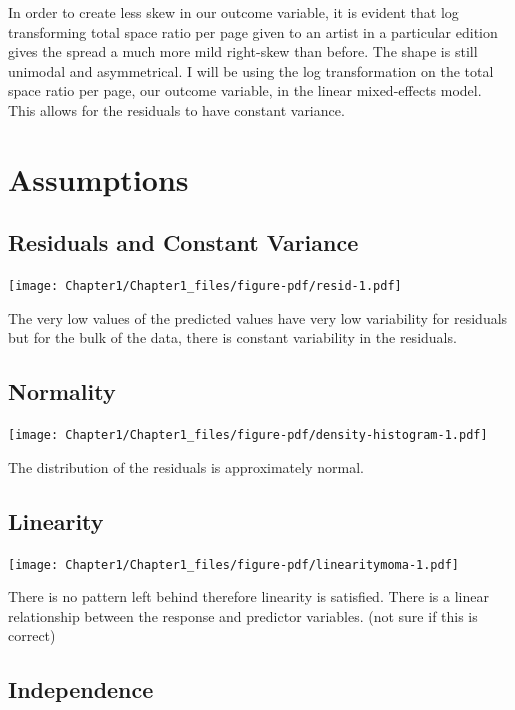\documentclass[
  letterpaper,
  DIV=11,
  numbers=noendperiod]{scrreprt}
\begin{document}
In order to create less skew in our outcome variable, it is evident that
log transforming total space ratio per page given to an artist in a
particular edition gives the spread a much more mild right-skew than
before. The shape is still unimodal and asymmetrical. I will be using
the log transformation on the total space ratio per page, our outcome
variable, in the linear mixed-effects model. This allows for the
residuals to have constant variance.

\hypertarget{assumptions}{%
\section{Assumptions}\label{assumptions}}

\hypertarget{residuals-and-constant-variance}{%
\subsection{Residuals and Constant
Variance}\label{residuals-and-constant-variance}}

\texttt{[image: Chapter1/Chapter1\_files/figure-pdf/resid-1.pdf]}

The very low values of the predicted values have very low variability
for residuals but for the bulk of the data, there is constant
variability in the residuals.

\hypertarget{normality}{%
\subsection{Normality}\label{normality}}

\texttt{[image: Chapter1/Chapter1\_files/figure-pdf/density-histogram-1.pdf]}

The distribution of the residuals is approximately normal.

\hypertarget{linearity}{%
\subsection{Linearity}\label{linearity}}

\texttt{[image: Chapter1/Chapter1\_files/figure-pdf/linearitymoma-1.pdf]}

There is no pattern left behind therefore linearity is satisfied. There
is a linear relationship between the response and predictor variables.
(not sure if this is correct)

\hypertarget{independence}{%
\subsection{Independence}\label{independence}}
\end{document}
